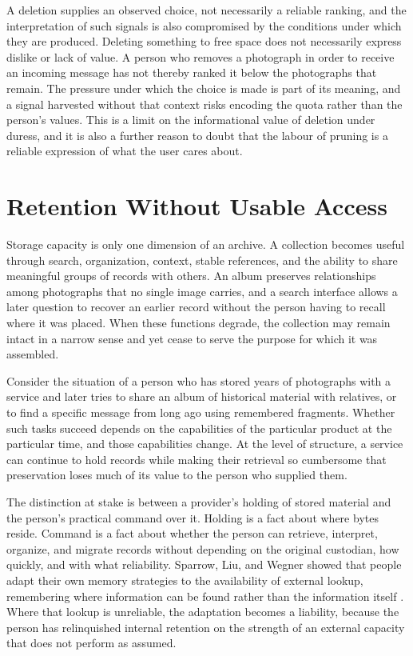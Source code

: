 \documentclass[12pt]{article}
\begin{document}
A deletion supplies an observed choice, not necessarily a reliable ranking, and the interpretation of such signals is also compromised by the conditions under which they are produced. Deleting something to free space does not necessarily express dislike or lack of value. A person who removes a photograph in order to receive an incoming message has not thereby ranked it below the photographs that remain. The pressure under which the choice is made is part of its meaning, and a signal harvested without that context risks encoding the quota rather than the person's values. This is a limit on the informational value of deletion under duress, and it is also a further reason to doubt that the labour of pruning is a reliable expression of what the user cares about.

\section{Retention Without Usable Access}

Storage capacity is only one dimension of an archive. A collection becomes useful through search, organization, context, stable references, and the ability to share meaningful groups of records with others. An album preserves relationships among photographs that no single image carries, and a search interface allows a later question to recover an earlier record without the person having to recall where it was placed. When these functions degrade, the collection may remain intact in a narrow sense and yet cease to serve the purpose for which it was assembled.

Consider the situation of a person who has stored years of photographs with a service and later tries to share an album of historical material with relatives, or to find a specific message from long ago using remembered fragments. Whether such tasks succeed depends on the capabilities of the particular product at the particular time, and those capabilities change. At the level of structure, a service can continue to hold records while making their retrieval so cumbersome that preservation loses much of its value to the person who supplied them.

The distinction at stake is between a provider's holding of stored material and the person's practical command over it. Holding is a fact about where bytes reside. Command is a fact about whether the person can retrieve, interpret, organize, and migrate records without depending on the original custodian, how quickly, and with what reliability. Sparrow, Liu, and Wegner showed that people adapt their own memory strategies to the availability of external lookup, remembering where information can be found rather than the information itself \cite{sparrow2011}. Where that lookup is unreliable, the adaptation becomes a liability, because the person has relinquished internal retention on the strength of an external capacity that does not perform as assumed.
\end{document}
